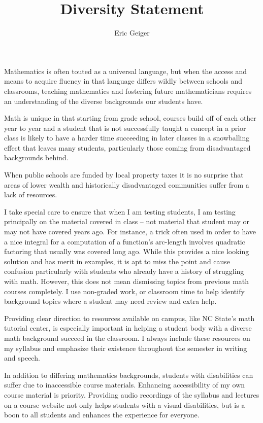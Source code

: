 \documentclass{article}[12pt]
\title{Diversity Statement}
\author{Eric Geiger}
\date{}
\begin{document}
\maketitle

Mathematics is often touted as a universal language, but when the access and means to acquire fluency in that language differs wildly between schools and classrooms, teaching mathematics and fostering future mathematicians requires an understanding of the diverse backgrounds our students have.

Math is unique in that starting from grade school, courses build off of each other year to year and a student that is not successfully taught a concept in a prior class is likely to have a harder time succeeding in later classes in a snowballing effect that leaves many students, particularly those coming from disadvantaged backgrounds behind.

When public schools are funded by local property taxes it is no surprise that areas of lower wealth and historically disadvantaged communities suffer from a lack of resources.

I take special care to ensure that when I am testing students, I am testing principally on the material covered in class -- not material that student may or may not have covered years ago. For instance, a trick often used in order to have a nice integral for a computation of a function's arc-length involves quadratic factoring that usually was covered long ago.
While this provides a nice looking solution and has merit in examples, it is apt to miss the point and cause confusion particularly with students who already have a history of struggling with math.  However, this does not mean dismissing topics from previous math courses completely.  I use non-graded work, or classroom time to help identify background topics where a student may need review and extra help.

Providing clear direction to resources available on campus, like NC State's math tutorial center, is especially important in helping a student body with a diverse math background succeed in the classroom.  I always include these resources on my syllabus and emphasize their existence throughout the semester in writing and speech.

In addition to differing mathematics backgrounds, students with disabilities can suffer due to inaccessible course materials. Enhancing accessibility of my own course material is priority.  Providing audio recordings of the syllabus and lectures on a course website not only helps students with a visual disabilities, but is a boon to all students and enhances the experience for everyone.
\end{document}
